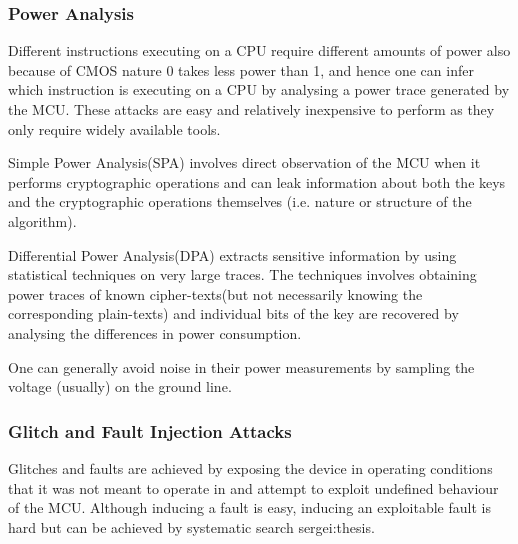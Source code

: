 	\subsubsection{Power Analysis}
	\label{subsubsec:power_analysis}
	Different instructions executing on a CPU require different amounts of power {\color{red}also because of CMOS nature 0 takes less power than 1}, and hence one can infer which instruction is executing on a CPU by analysing a power trace generated by the MCU. These attacks are easy and relatively inexpensive to perform as they only require widely available tools.
	
	Simple Power Analysis(SPA) involves direct observation of the MCU when it performs cryptographic operations and can leak information about both the keys and the cryptographic operations themselves (i.e. nature or structure of the algorithm)\citep{kocher:DPA}\citep{anderson:tamper_resistance}. 

	Differential Power Analysis(DPA) extracts sensitive information by using statistical techniques on very large traces. The techniques involves obtaining power traces of known cipher-texts(but not necessarily knowing the corresponding plain-texts) and individual bits of the key are recovered by analysing the differences in power consumption\citep{kocher:DPA}\citep{anderson:tamper_resistance}.
	
	One can generally avoid noise in their power measurements by sampling the voltage (usually) on the ground line\citep{sergei:thesis}.

	\subsubsection{Glitch and Fault Injection Attacks}
	Glitches and faults are achieved by exposing the device in operating conditions that it was not meant to operate in and attempt to exploit undefined behaviour of the MCU\citep{sergei:thesis}\citep{avr_mega}. Although inducing a fault is easy, inducing an exploitable fault is hard but can be achieved by systematic search {sergei:thesis}\citep{glitches_paper}\citep{website:riscure}.
	
